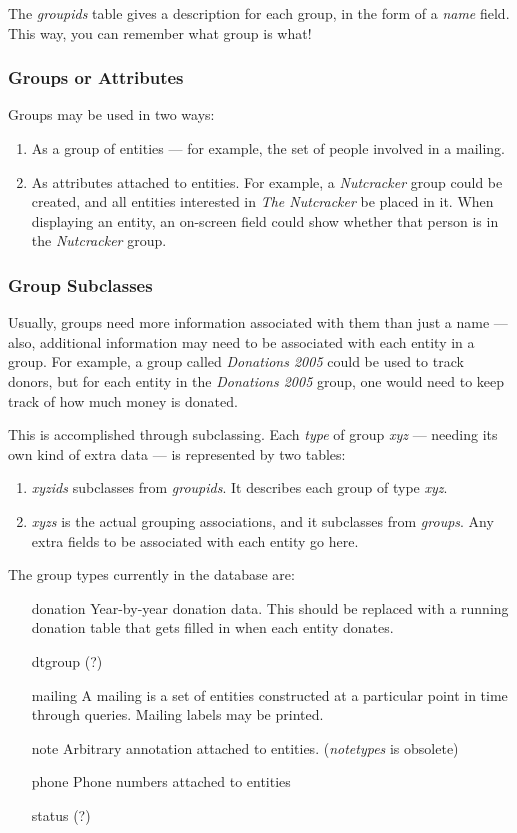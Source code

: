 The \emph{groupids} table gives a description for each group, in the form of a \emph{name} field.  This way, you can remember what group is what!

\subsubsection{Groups or Attributes}

Groups may be used in two ways:

\begin{enumerate}
 \item As a group of entities --- for example, the set of people involved in a mailing.
 \item As attributes attached to entities.  For example, a \emph{Nutcracker} group could be created, and all entities interested in \emph{The Nutcracker} be placed in it.  When displaying an entity, an on-screen field could show whether that person is in the \emph{Nutcracker} group.
 \end{enumerate}

\subsubsection{Group Subclasses}

Usually, groups need more information associated with them than just a name --- also, additional information may need to be associated with each entity in a group.  For example, a group called \emph{Donations 2005} could be used to track donors, but for each entity in the \emph{Donations 2005} group, one would need to keep track of how much money is donated.

This is accomplished through subclassing. Each \emph{type} of group \emph{xyz} --- needing its own kind of extra data --- is represented by two tables:
	\begin{enumerate}
 \item \emph{xyzids} subclasses from \emph{groupids}.  It describes each group of type \emph{xyz}.
 \item \emph{xyzs} is the actual grouping associations, and it subclasses from \emph{groups}.  Any extra fields to be associated with each entity go here.
 \end{enumerate}

The group types currently in the database are:
 \begin{enumerate}
\item[donation] Year-by-year donation data.  This should be replaced with a running donation table that gets filled in when each entity donates.
 \item[dtgroup] (?)
 \item[mailing] A mailing is a set of entities constructed at a particular point in time through queries.  Mailing labels may be printed.
 \item[note] Arbitrary annotation attached to entities. (\emph{notetypes} is obsolete)
 \item[phone] Phone numbers attached to entities
 \item[status] (?)
 \end{enumerate}


